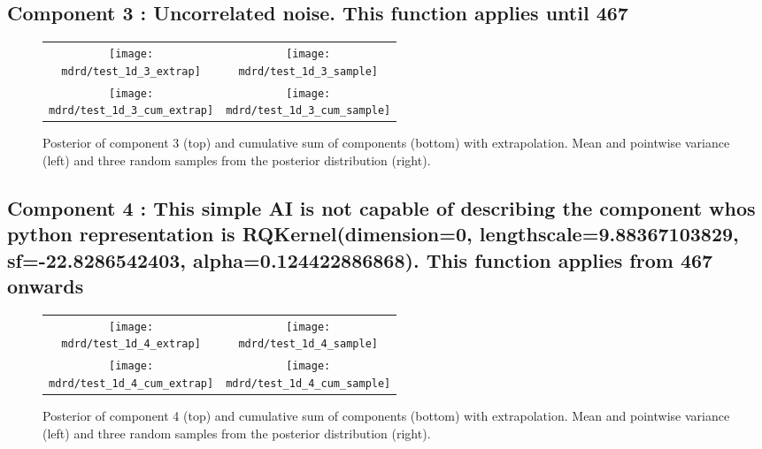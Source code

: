 \documentclass{article} %
\begin{document}
\subsection{Component 3 : Uncorrelated noise. This function applies until  467}



\begin{figure}[H]
\newcommand{\wmgd}{0.5\columnwidth}
\newcommand{\hmgd}{3.0cm}
\newcommand{\mdrd}{test_1d}
\newcommand{\mbm}{\hspace{-0.3cm}}
\begin{tabular}{cc}
\mbm \texttt{[image: \\mdrd/test\_1d\_3\_extrap]} & \texttt{[image: \\mdrd/test\_1d\_3\_sample]} \\
\mbm \texttt{[image: \\mdrd/test\_1d\_3\_cum\_extrap]} & \texttt{[image: \\mdrd/test\_1d\_3\_cum\_sample]}
\end{tabular}
\caption{Posterior of component 3 (top) and cumulative sum of components (bottom) with extrapolation. Mean and pointwise variance (left) and three random samples from the posterior distribution (right).}
\label{fig:extrap3}
\end{figure}

\subsection{Component 4 : This simple AI is not capable of describing the component whos python representation is RQKernel(dimension=0, lengthscale=9.88367103829, sf=-22.8286542403, alpha=0.124422886868). This function applies from  467 onwards}



\begin{figure}[H]
\newcommand{\wmgd}{0.5\columnwidth}
\newcommand{\hmgd}{3.0cm}
\newcommand{\mdrd}{test_1d}
\newcommand{\mbm}{\hspace{-0.3cm}}
\begin{tabular}{cc}
\mbm \texttt{[image: \\mdrd/test\_1d\_4\_extrap]} & \texttt{[image: \\mdrd/test\_1d\_4\_sample]} \\
\mbm \texttt{[image: \\mdrd/test\_1d\_4\_cum\_extrap]} & \texttt{[image: \\mdrd/test\_1d\_4\_cum\_sample]}
\end{tabular}
\caption{Posterior of component 4 (top) and cumulative sum of components (bottom) with extrapolation. Mean and pointwise variance (left) and three random samples from the posterior distribution (right).}
\label{fig:extrap4}
\end{figure}
\end{document}
